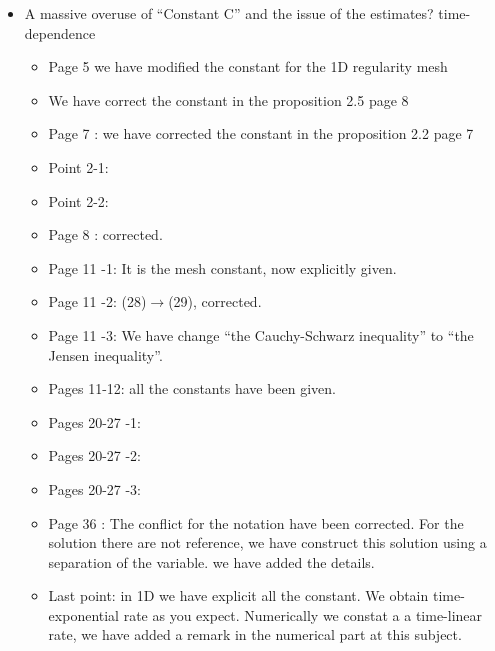 \documentclass[a4paper,french,english,10pt]{article}
\begin{document}
\begin{itemize}
\item A massive overuse of ``Constant C'' and the issue of the estimates? time-dependence
\begin{itemize}
\item Page 5 we have modified the constant for the 1D regularity mesh
\item We have correct the constant in the proposition 2.5 page 8
\item Page 7 : we have corrected the constant in the proposition 2.2 page 7
\item Point 2-1:
\item Point 2-2:
\item Page 8 : corrected.
\item Page 11 -1: It is the mesh constant, now explicitly given.
\item Page 11 -2: (28)$\to$(29), corrected.
\item Page 11 -3: We have change ``the Cauchy-Schwarz inequality'' to ``the Jensen inequality''.
\item Pages 11-12: all the constants have been given.
\item Pages 20-27 -1:
\item Pages 20-27 -2:
\item Pages 20-27 -3:
\item Page 36 : The conflict for the notation have been corrected. For the solution there are not reference, we have construct this solution using a separation of the variable. we have added the details.
\item Last point: in 1D we have explicit all the constant. We obtain time-exponential rate as you expect. Numerically we constat a a time-linear rate, we have added a remark in the numerical part at this subject. 
\end{itemize}
\end{itemize}
\end{document}
